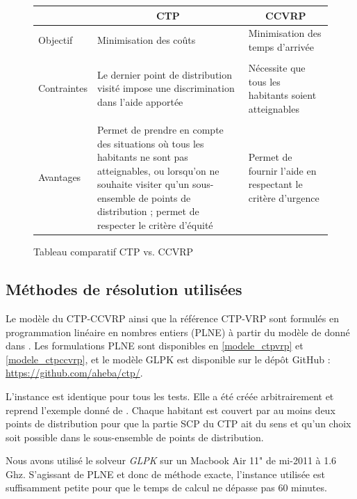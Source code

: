 \documentclass[5p,authoryear]{elsarticle}
\begin{document}
\begin{figure}
\centering \begin{tabular}{p{2cm} p{8cm} p{6cm}} \toprule
& \multicolumn{1}{c}{CTP} & \multicolumn{1}{c}{CCVRP} \\ \midrule
Objectif & Minimisation des coûts & Minimisation des temps d'arrivée \\ \\
Contraintes & Le dernier point de distribution visité impose une discrimination dans l'aide apportée & Nécessite que tous les habitants soient atteignables  \\  \\ 
Avantages & Permet de prendre en compte des situations où tous les habitants ne sont pas atteignables, ou lorsqu'on ne souhaite visiter qu'un sous-ensemble de points de distribution ; permet de respecter le critère d'équité & Permet de fournir l'aide en respectant le critère d'urgence \\ \bottomrule
\end{tabular} \caption{Tableau comparatif CTP vs. CCVRP} \label{comparatif}
\end{figure}

\subsection{Méthodes de résolution utilisées}
Le modèle du CTP-CCVRP ainsi que la référence CTP-VRP sont formulés en programmation linéaire en nombres entiers (PLNE) à partir du modèle de donné dans \cite{naji-azimi_covering_2012}. Les formulations PLNE sont disponibles en \cref{modele_ctpvrp} et \cref{modele_ctpccvrp}, et le modèle GLPK est disponible sur le dépôt GitHub : \url{https://github.com/aheba/ctp/}.

L'instance est identique pour tous les tests. Elle a été créée arbitrairement et reprend l'exemple donné de \cite{naji-azimi_covering_2012}. Chaque habitant est couvert par au moins deux points de distribution pour que la partie SCP du CTP ait du sens et qu'un choix soit possible dans le sous-ensemble de points de distribution.

Nous avons utilisé le solveur \emph{GLPK} sur un Macbook Air 11" de mi-2011 à 1.6 Ghz. S'agissant de PLNE et donc de méthode exacte, l'instance utilisée est suffisamment petite pour que le temps de calcul ne dépasse pas 60 minutes.
\end{document}
